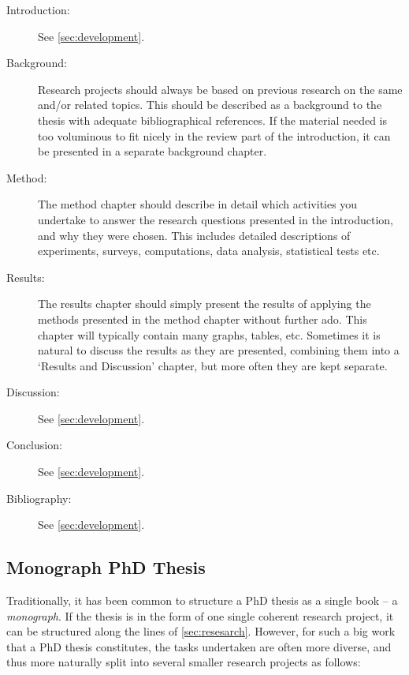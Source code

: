 \begin{description}
    \item[Introduction:] See \cref{sec:development}.
    \item[Background:] Research projects should always be based on previous research on the same and/or related topics. This should be described as a background to the thesis with adequate bibliographical references. If the material needed is too voluminous to fit nicely in the review part of the introduction, it can be presented in a separate background chapter.
    \item[Method:] The method chapter should describe in detail which activities you undertake to answer the research questions presented in the introduction, and why they were chosen. This includes detailed descriptions of experiments, surveys, computations, data analysis, statistical tests etc.
    \item[Results:] The results chapter should simply present the results of applying the methods presented in the method chapter without further ado. This chapter will typically contain many graphs, tables, etc. Sometimes it is natural to discuss the results as they are presented, combining them into a `Results and Discussion' chapter, but more often they are kept separate.
    \item[Discussion:] See \cref{sec:development}.
    \item[Conclusion:] See \cref{sec:development}.
    \item[Bibliography:] See \cref{sec:development}.
\end{description}

\subsection{Monograph PhD Thesis}
\label{sec:monograph}

Traditionally, it has been common to structure a PhD thesis as a single book – a \emph{monograph}. If the thesis is in the form of one single coherent research project, it can be structured along the lines of \cref{sec:resesarch}. However, for such a big work that a PhD thesis constitutes, the tasks undertaken are often more diverse, and thus more naturally split into several smaller research projects as follows:

